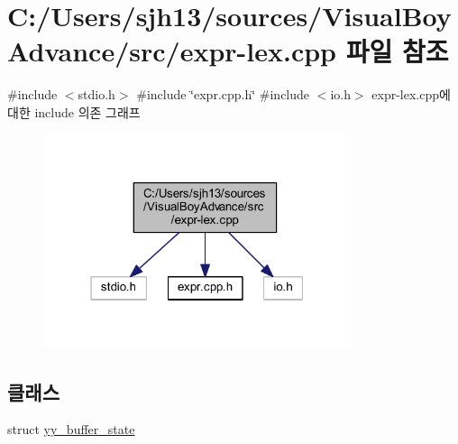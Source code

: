 \hypertarget{expr-lex_8cpp}{}\section{C\+:/\+Users/sjh13/sources/\+Visual\+Boy\+Advance/src/expr-\/lex.cpp 파일 참조}
\label{expr-lex_8cpp}
{\ttfamily \#include $<$stdio.\+h$>$}\newline
{\ttfamily \#include \char`\"{}expr.\+cpp.\+h\char`\"{}}\newline
{\ttfamily \#include $<$io.\+h$>$}\newline
expr-\/lex.cpp에 대한 include 의존 그래프
\nopagebreak
\begin{figure}[H]
\begin{center}
\leavevmode
\includegraphics[width=256pt]{expr-lex_8cpp__incl}
\end{center}
\end{figure}
\subsection*{클래스}
\begin{DoxyCompactItemize}
\item 
struct \mbox{\hyperlink{structyy__buffer__state}{yy\+\_\+buffer\+\_\+state}}
\end{DoxyCompactItemize}
